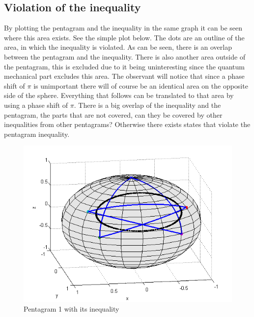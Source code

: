 \subsection{Violation of the inequality}\label{subsec:Violation of the inequalit}
By plotting the pentagram and the inequality in the same graph it can be seen where this area exists. See the simple plot below.
The dots are an outline of the area, in which the inequality is violated. As can be seen, there is an overlap between the pentagram and the inequality. There is also another area outside of the pentagram, this is excluded due to it being uninteresting since the quantum mechanical part excludes this area.
The observant will notice that since a phase shift of $\pi$ is unimportant there will of course be an identical area on the opposite side of the sphere. Everything that follows can be translated to that area by using a phase shift of $\pi$. There is a big overlap of the inequality and the pentagram, the parts that are not covered, can they be covered by other inequalities from other pentagrams? Otherwise there exists states that violate the pentagram inequality.
\begin{figure}[H]
\begin{center}
\includegraphics[scale=0.5]{sphere1ine.png}
\caption{Pentagram 1 with its inequality}
\end{center}
\end{figure}
\newpage
